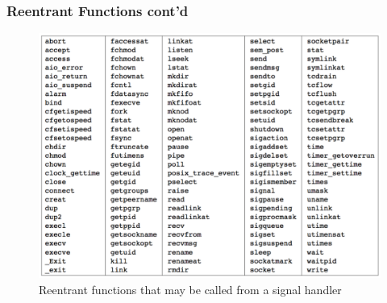 \documentclass[newPxFont,sthlmFooter,nooffset]{beamer}
\begin{document}
\begin{frame}
  \frametitle{Reentrant Functions cont'd}  
  \begin{figure}[h]
    \centering
    \includegraphics[height=0.87\textheight]{figure/fig10-4_reentrant.png}
    \caption{Reentrant functions that may be called from a signal handler}
  \end{figure}
\end{frame}

\end{document}
